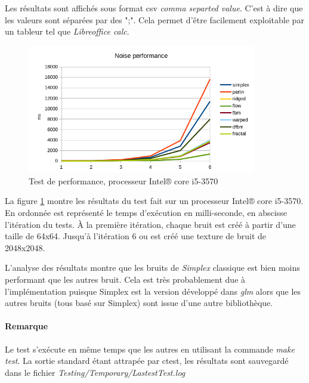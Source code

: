Les résultats sont affichés sous format csv \textit{comma separted value}. C'est à dire que les valeurs sont séparées par des ";". Cela permet d'être facilement exploitable par un tableur tel que \textit{Libreoffice calc}.


\begin{figure}
    \centering
    \includegraphics[width=10cm]{img/bench_i53570.png}
    \caption{Test de performance, processeur Intel® core i5-3570}
    \label{fig:bench}
\end{figure}

La figure \ref{fig:bench} montre les résultats du test fait sur un processeur Intel® core i5-3570.\\
En ordonnée est représenté le temps d'exécution en milli-seconde, en abscisse l'itération du tests.
À la première itération, chaque bruit est créé à partir d'une taille de 64x64. Jusqu'à l'itération 6 ou est créé une texture de bruit de 2048x2048.


L'analyse des résultats montre que les bruits de \textit{Simplex} classique est bien moins performant que les autres bruit. Cela est très probablement due à l'implémentation puisque Simplex est la version développé dans \textit{glm} alors que les autres bruits (tous basé sur Simplex) sont issue d'une autre bibliothèque. \\

\paragraph{Remarque}

Le test s'exécute en même temps que les autres en utilisant la commande \textit{make test}.
La sortie standard étant attrapée par ctest, les résultats sont sauvegardé dans le fichier \textit{Testing/Temporary/LastestTest.log}


